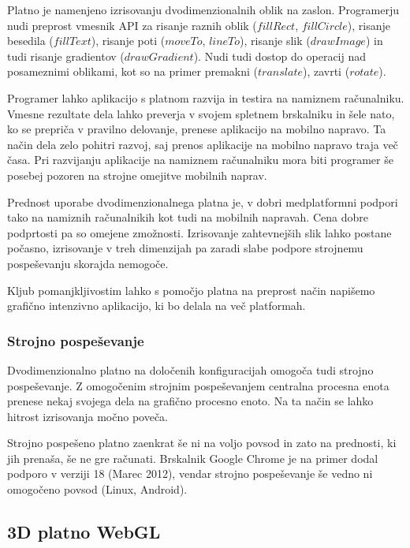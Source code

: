 
Platno je namenjeno izrisovanju dvodimenzionalnih oblik na zaslon. Programerju nudi preprost vmesnik API za risanje raznih oblik ($fillRect$, $fillCircle$), risanje besedila ($fillText$), risanje poti ($moveTo$, $lineTo$), risanje slik ($drawImage$) in tudi risanje gradientov ($drawGradient$). Nudi tudi dostop do operacij nad posameznimi oblikami, kot so na primer premakni ($translate$), zavrti ($rotate$). 

Programer lahko aplikacijo s platnom razvija in testira na namiznem računalniku. Vmesne rezultate dela lahko preverja v svojem spletnem brskalniku in šele nato, ko se prepriča v pravilno delovanje, prenese aplikacijo na mobilno napravo. Ta način dela zelo pohitri razvoj, saj prenos aplikacije na mobilno napravo traja več časa. Pri razvijanju aplikacije na namiznem računalniku mora biti programer še posebej pozoren na strojne omejitve mobilnih naprav. 

Prednost uporabe dvodimenzionalnega platna je, v dobri medplatformni podpori tako na namiznih računalnikih kot tudi na mobilnih napravah. Cena dobre podprtosti pa so omejene zmožnosti. Izrisovanje zahtevnejših slik lahko postane počasno, izrisovanje v treh dimenzijah pa zaradi slabe podpore strojnemu pospeševanju skorajda nemogoče. 

Kljub pomanjkljivostim lahko s pomočjo platna na preprost način napišemo grafično intenzivno aplikacijo, ki bo delala na več platformah. 

\subsubsection{Strojno pospeševanje}

Dvodimenzionalno platno na določenih konfiguracijah omogoča tudi strojno pospeševanje. Z omogočenim strojnim pospeševanjem centralna procesna enota prenese nekaj svojega dela na grafično procesno enoto. Na ta način se lahko hitrost izrisovanja močno poveča.

Strojno pospešeno platno zaenkrat še ni na voljo povsod in zato na prednosti, ki jih prenaša, še ne gre računati. Brskalnik Google Chrome je na primer dodal podporo v verziji 18 (Marec 2012), vendar strojno pospeševanje še vedno ni omogočeno povsod (Linux, Android).

\subsection{3D platno WebGL}
\label{sec:WebGL}


